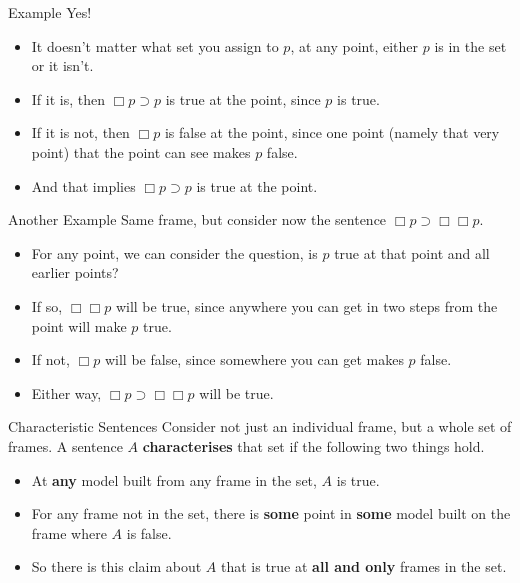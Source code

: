 \documentclass[
  14pt,
  letterpaper,
  ignorenonframetext,
  handout]{beamer}
\providecommand{\tightlist}{%
  \setlength{\itemsep}{0pt}\setlength{\parskip}{0pt}}\usepackage{longtable,booktabs,array}
\begin{document}
\begin{frame}{Example}
\protect\hypertarget{example-1}{}
Yes!

\begin{itemize}
\tightlist
\item
  It doesn't matter what set you assign to \(p\), at any point, either
  \(p\) is in the set or it isn't.
\item
  If it is, then \(\Box p \supset p\) is true at the point, since \(p\)
  is true.
\item
  If it is not, then \(\Box p\) is false at the point, since one point
  (namely that very point) that the point can see makes \(p\) false.
\item
  And that implies \(\Box p \supset p\) is true at the point.
\end{itemize}
\end{frame}

\begin{frame}{Another Example}
\protect\hypertarget{another-example}{}
Same frame, but consider now the sentence
\(\Box p \supset \Box \Box p\).

\begin{itemize}
\tightlist
\item
  For any point, we can consider the question, is \(p\) true at that
  point and all earlier points?
\item
  If so, \(\Box \Box p\) will be true, since anywhere you can get in two
  steps from the point will make \(p\) true.
\item
  If not, \(\Box p\) will be false, since somewhere you can get makes
  \(p\) false.
\item
  Either way, \(\Box p \supset \Box \Box p\) will be true.
\end{itemize}
\end{frame}

\begin{frame}{Characteristic Sentences}
\protect\hypertarget{characteristic-sentences}{}
Consider not just an individual frame, but a whole set of frames. A
sentence \(A\) \textbf{characterises} that set if the following two
things hold.

\begin{itemize}
\tightlist
\item
  At \textbf{any} model built from any frame in the set, \(A\) is true.
\item
  For any frame not in the set, there is \textbf{some} point in
  \textbf{some} model built on the frame where \(A\) is false.
\item
  So there is this claim about \(A\) that is true at \textbf{all and
  only} frames in the set.
\end{itemize}
\end{frame}
\end{document}
